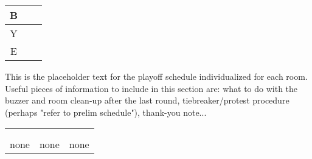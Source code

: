 \documentclass{article}%
\begin{document}
%
\begin{tabularx}{\textwidth}{|c|Y|Y|}%
\hline%
B\\%
\hline%
Y\\%
E\\%
\hline%
\end{tabularx}%
\vspace*{16pt}%
\linebreak%
This is the placeholder text for the playoff schedule individualized for each room. Useful pieces of information to include in this section are: what to do with the buzzer and room clean{-}up after the last round, tiebreaker/protest procedure (perhaps "refer to prelim schedule"), thank{-}you note...%
\vspace*{30pt}%
\newline%
%
\begin{tabularx}{\textwidth}{YYY}%
  &  &  \\%
\\%
none&none&none\\%
\end{tabularx}%
\newpage%
\end{document}
